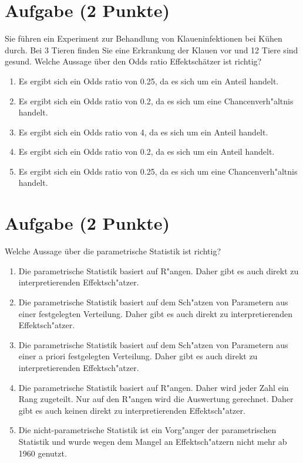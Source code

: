 \documentclass[a4paper, 9pt]{scrartcl}\usepackage[]{graphicx}\usepackage[]{xcolor}
\begin{document}
\section{Aufgabe \hfill (2 Punkte)}



Sie f{\"u}hren ein Experiment zur Behandlung von Klaueninfektionen bei K{\"u}hen
durch. Bei 3 Tieren finden Sie eine Erkrankung der Klauen vor und
12 Tiere sind gesund. Welche Aussage {\"u}ber den Odds ratio
Effektsch{\"a}tzer ist richtig?



\begin{enumerate}
\item [\textbf{A} \msquare] Es ergibt sich ein Odds ratio von 0.25, da es sich um ein Anteil handelt.
\item [\textbf{B} \msquare] Es ergibt sich ein Odds ratio von 0.2, da es sich um eine Chancenverh{"a}ltnis handelt.
\item [\textbf{C} \msquare] Es ergibt sich ein Odds ratio von 4, da es sich um ein Anteil handelt.
\item [\textbf{D} \msquare] Es ergibt sich ein Odds ratio von 0.2, da es sich um ein Anteil handelt.
\item [\textbf{E} \msquare] Es ergibt sich ein Odds ratio von 0.25, da es sich um eine Chancenverh{"a}ltnis handelt.
\end{enumerate}

\section{Aufgabe \hfill (2 Punkte)}




Welche Aussage {\"u}ber die parametrische Statistik ist richtig?



\begin{enumerate}
\item [\textbf{A} \msquare] Die parametrische Statistik basiert auf R{"a}ngen. Daher gibt es auch direkt zu interpretierenden Effektsch{"a}tzer.
\item [\textbf{B} \msquare] Die parametrische Statistik basiert auf dem Sch{"a}tzen von Parametern aus einer festgelegten Verteilung. Daher gibt es auch direkt zu interpretierenden Effektsch{"a}tzer.
\item [\textbf{C} \msquare] Die parametrische Statistik basiert auf dem Sch{"a}tzen von Parametern aus einer a priori festgelegten Verteilung. Daher gibt es auch direkt zu interpretierenden Effektsch{"a}tzer.
\item [\textbf{D} \msquare] Die parametrische Statistik basiert auf R{"a}ngen. Daher wird jeder Zahl ein Rang zugeteilt. Nur auf den R{"a}ngen wird die Auswertung gerechnet. Daher gibt es auch keinen direkt zu interpretierenden Effektsch{"a}tzer.
\item [\textbf{E} \msquare] Die nicht-parametrische Statistik ist ein Vorg{"a}nger der parametrischen Statistik und wurde wegen dem Mangel an Effektsch{"a}tzern nicht mehr ab 1960 genutzt.
\end{enumerate}
\end{document}
